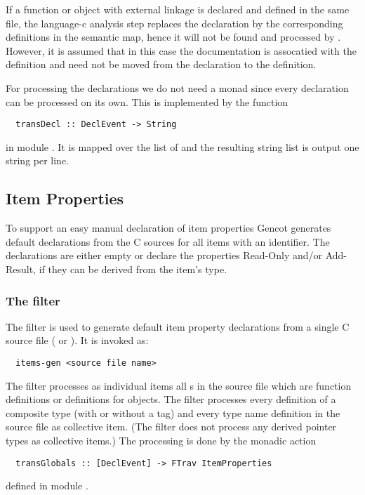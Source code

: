 If a function or object with external linkage is declared and defined in the same file, the language-c analysis step
replaces the declaration by the corresponding definitions in the semantic map, hence it will not be found and processed
by . However, it is assumed that in this case the documentation is assocatied with the definition
and need not be moved from the declaration to the definition.

For processing the declarations we do not need a monad since every declaration can be processed on its own. This is implemented
by the function
\begin{verbatim}
  transDecl :: DeclEvent -> String
\end{verbatim}
in module . It is mapped over the list of  and the resulting string list
is output one string per line.

\subsection{Item Properties}
\label{impl-ccomps-itemprops}

To support an easy manual declaration of item properties Gencot generates default declarations from the C sources for all 
items with an identifier. The declarations are either empty or declare the properties Read-Only and/or Add-Result, if they
can be derived from the item's type. 

\subsubsection{The filter }

The filter  is used to generate default item property declarations from a single C source file ( or ).
It is invoked as:
\begin{verbatim}
  items-gen <source file name>
\end{verbatim}

The filter processes as individual items all s in the source file which are function
definitions or definitions for objects. The filter processes every definition of a composite type 
(with or without a tag) and every type name definition in the source file as collective item. (The filter does not
process any derived pointer types as collective items.) The processing is done by the monadic action
\begin{verbatim}
  transGlobals :: [DeclEvent] -> FTrav ItemProperties
\end{verbatim}
defined in module .

